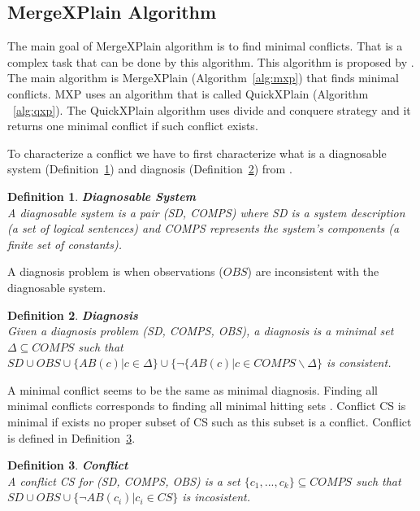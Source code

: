 \documentclass[12pt,a4paper]{article}
\newtheorem{definition}{Definition}[subsection]
\begin{document}
\subsection{MergeXPlain Algorithm}
The main goal of MergeXPlain algorithm is to find minimal conflicts. That is a complex task that can be done by this algorithm. This algorithm is proposed by \cite{MXP}. The main algorithm is MergeXPlain (Algorithm~\ref{alg:mxp}) that finds minimal conflicts. MXP uses an algorithm that is called QuickXPlain (Algorithm ~\ref{alg:qxp}). The QuickXPlain algorithm uses divide and conquere strategy and it returns one minimal conflict if such conflict exists. 

To characterize a conflict we have to first characterize what is a diagnosable system (Definition~\ref{def:diagnosableSystem}) and diagnosis (Definition~\ref{def:diagnosis}) from \cite{reiterHS}.

\begin{definition}{\textbf{Diagnosable System}} \\
	\label{def:diagnosableSystem}
	\noindent A diagnosable system is a pair (SD, COMPS) where SD is a system description (a set of logical sentences) and COMPS represents the system's components (a finite set of constants).
\end{definition}

A diagnosis problem is when observations ($OBS$) are inconsistent with the diagnosable system.

\begin{definition}{\textbf{Diagnosis}} \\
	\label{def:diagnosis}
	\noindent Given a diagnosis problem (SD, COMPS, OBS), a diagnosis is a minimal set $\Delta \subseteq COMPS$ such that $SD \cup OBS \cup \{ AB(c) | c \in \Delta \} \cup \{ \neg \{AB(c) | c \in COMPS \backslash \Delta \}$ is consistent.
\end{definition}

A minimal conflict seems to be the same as minimal diagnosis. Finding all minimal conflicts corresponds to finding all minimal hitting sets \citep{reiterHS}. Conflict CS is minimal if exists no proper subset of CS such as this subset is a conflict. Conflict is defined in Definition~\ref{def:conflict}.

\begin{definition}{\textbf{Conflict}} \\
	\label{def:conflict}
	\noindent A conflict CS for (SD, COMPS, OBS) is a set $\{c_{1}, ..., c_{k}\} \subseteq COMPS$ such that $SD \cup OBS \cup \{ \neg AB(c_{i}) | c_{i} \in CS \} $ is incosistent.
\end{definition}
\end{document}
